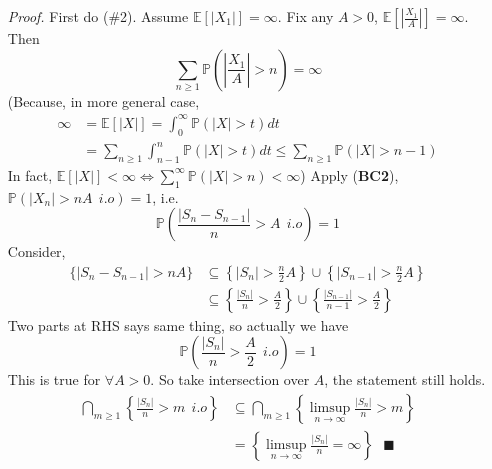 \documentclass[a4paper,12pt,twoside]{book}
\begin{document}
\begin{itemize}
	\item[\textit{Proof.}] First do (\#2). Assume $\mathbb{E}\left[|X_1|\right]=\infty$. Fix any $A>0$, $\mathbb{E}\left[|\frac{X_1}{A}|\right]=\infty$.\newline
	Then
	\begin{equation}
		\sum_{n\geq 1}\mathbb{P}\left(\left|\frac{X_1}{A}\right|>n\right)=\infty
	\end{equation}
	(Because, in more general case,
	\begin{equation}
		\begin{split}
			\infty &= \mathbb{E}\left[|X|\right]=\int_0^{\infty}\mathbb{P}\left(|X|>t\right)dt\\
			&=\sum_{n\geq 1}\int_{n-1}^n \mathbb{P}\left(|X|>t\right)dt\leq \sum_{n\geq 1}\mathbb{P}\left(|X|>n-1\right)
		\end{split}
	\end{equation}
	In fact, $\mathbb{E}\left[|X|\right]<\infty \iff \sum_1^{\infty} \mathbb{P}\left(|X|>n\right)<\infty$)\newline
	Apply (\textbf{BC2}), $\mathbb{P}\left(|X_n|>nA~~i.o\right)=1$, i.e.
	\begin{equation}
		\mathbb{P}\left(\frac{|S_n-S_{n-1}|}{n}>A~~i.o\right)=1
	\end{equation}
	Consider,
	\begin{equation}
		\begin{split}
			\{|S_n-S_{n-1}|>nA\}&\subseteq \left\{|S_n|>\frac{n}{2}A\right\}\cup\left\{|S_{n-1}|>\frac{n}{2}A\right\}\\
			&\subseteq \left\{\frac{|S_n|}{n}>\frac{A}{2}\right\}\cup\left\{\frac{|S_{n-1}|}{n-1}>\frac{A}{2}\right\}
		\end{split}
	\end{equation}
	Two parts at RHS says same thing, so actually we have
	\begin{equation}
		\mathbb{P}\left(\frac{|S_n|}{n}>\frac{A}{2}~~i.o\right)=1
	\end{equation}
	This is true for $\forall A>0$. So take intersection over $A$, the statement still holds.
	\begin{equation}
		\begin{split}
			\bigcap_{m\geq1}\left\{\frac{|S_n|}{n}>m~~i.o\right\} &\subseteq \bigcap_{m\geq1}\left\{\limsup\limits_{n\rightarrow\infty}\frac{|S_n|}{n}>m\right\}\\
			&=\left\{\limsup\limits_{n\rightarrow\infty}\frac{|S_n|}{n}=\infty\right\}~~~\blacksquare
		\end{split}
	\end{equation}

\end{itemize}
\end{document}
